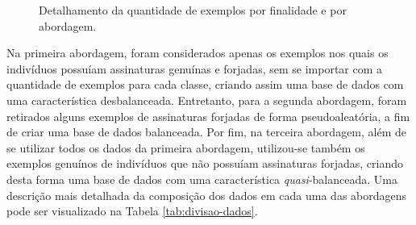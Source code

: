 \begin{figure}[h!]
	\centering
	\caption{Detalhamento da quantidade de exemplos por finalidade e por abordagem.}
	\hfill
	\label{fig:divisao-dados}
\end{figure}

Na primeira abordagem, foram considerados apenas os exemplos nos quais os indivíduos possuíam assinaturas genuínas e forjadas, sem se importar com a quantidade de exemplos para cada classe, criando assim uma base de dados com uma característica desbalanceada. Entretanto, para a segunda abordagem, foram retirados alguns exemplos de assinaturas forjadas de forma pseudoaleatória, a fim de criar uma base de dados balanceada. Por fim, na terceira abordagem, além de se utilizar todos os dados da primeira abordagem, utilizou-se também os exemplos genuínos de indivíduos que não possuíam assinaturas forjadas, criando desta forma uma base de dados com uma característica \emph{quasi}-balanceada. Uma descrição mais detalhada da composição dos dados em cada uma das abordagens pode ser visualizado na Tabela \ref{tab:divisao-dados}.

